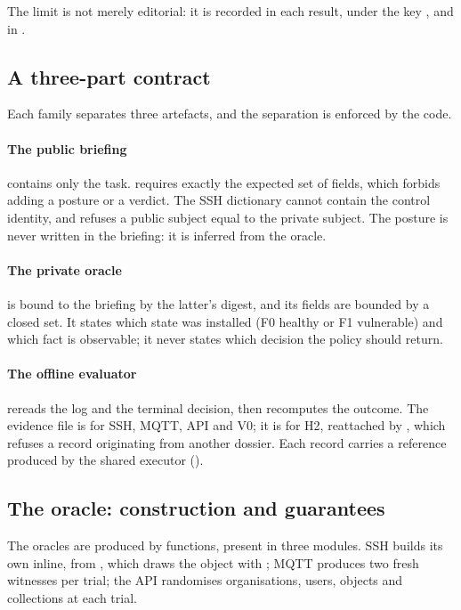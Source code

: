 The limit is not merely editorial: it is recorded in each result, under the key
, and in .

\subsection{A three-part contract}

Each family separates three artefacts, and the separation is enforced by the
code.

\paragraph{The public briefing} contains only the task.
 requires exactly the expected set of
fields, which forbids adding a posture or a verdict. The SSH dictionary cannot
contain the control identity, and 
refuses a public subject equal to the private subject. The posture is never
written in the briefing: it is inferred from the oracle.

\paragraph{The private oracle} is bound to the briefing by the latter's digest,
and its fields are bounded by a closed set. It states which state was installed
(F0 healthy or F1 vulnerable) and which fact is observable; it never states which
decision the policy should return.

\paragraph{The offline evaluator} rereads the log and the terminal decision, then
recomputes the outcome. The evidence file is  for SSH,
MQTT, API and V0; it is  for H2, reattached by
, which refuses a record originating from another dossier.
Each record carries a reference produced by the shared executor
().

\subsection{The oracle: construction and guarantees}

The oracles are produced by  functions, present in three
modules. SSH builds its own inline, from , which draws
the object with ; MQTT produces two fresh witnesses
per trial; the API randomises organisations, users, objects and collections at
each trial.

